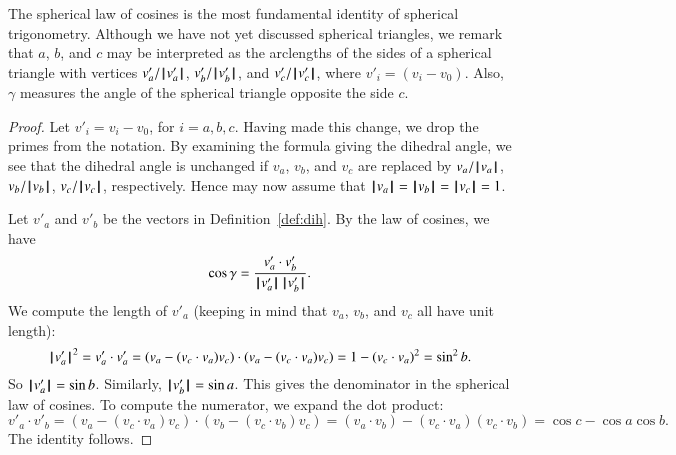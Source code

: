 The spherical law of cosines is the most fundamental identity
of spherical trigonometry.
Although we have not yet discussed spherical
triangles, we remark that $a$, $b$, and $c$ may be interpreted as
the arclengths of the sides of a spherical triangle with
vertices $v'_a/\normo{v'_a}$, $v'_b/\normo{v'_b}$, and $v'_c/\normo{v'_c}$,
where $v'_i = (v_i-v_0)$.  Also,
$\gamma$ measures the angle of the spherical triangle opposite the
side $c$.


\begin{proof}  Let $v'_i = v_i - v_0$, for $i=a,b,c$.  Having
made this change, we drop the primes from the notation.
By examining the formula giving the dihedral angle, we see that the
dihedral angle is unchanged if $v_a$, $v_b$, and $v_c$ are replaced
by $v_a/\normo{v_a}$, $v_b/\normo{v_b}$, $v_c/\normo{v_c}$, respectively.  Hence
may now assume that $\normo{v_a}=\normo{v_b}=\normo{v_c}=1$.

Let $v'_a$ and $v'_b$ be the vectors in Definition~\ref{def:dih}.
By the law of cosines, we have
        $$\cos\gamma = \frac{v'_a\cdot v'_b}{\normo{v'_a}\,\normo{v'_b}}.$$
We compute the length of $v'_a$ (keeping in mind that $v_a$, $v_b$,
and $v_c$ all have unit length):
        $$
        \normo{v'_a}^2 = v'_a\cdot v'_a =
        (v_a - (v_c\cdot v_a)v_c)\cdot (v_a - (v_c\cdot v_a) v_c) =
        1 - (v_c\cdot v_a)^2 = \sin^2 b.
        $$
So $\normo{v'_a} =\sin b$. Similarly, $\normo{v'_b} = \sin a$.  This gives
the denominator in the spherical law of cosines. To compute the
numerator, we expand the dot product:
    $$
    v'_a\cdot v'_b = (v_a - (v_c\cdot v_a) v_c)\cdot (v_b - (v_c\cdot v_b) v_c)
    = (v_a\cdot v_b) - (v_c\cdot v_a) (v_c\cdot v_b) = \cos c - \cos
    a \cos b.
    $$
The identity follows.
\end{proof}

